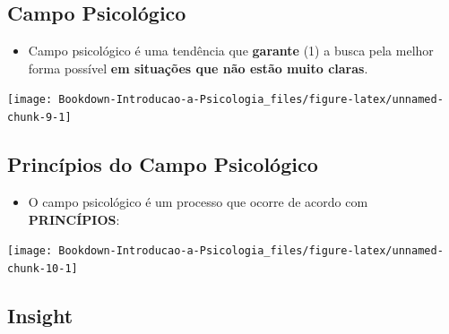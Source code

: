 \documentclass[
]{book}
\providecommand{\tightlist}{%
  \setlength{\itemsep}{0pt}\setlength{\parskip}{0pt}}
\begin{document}
\hypertarget{campo-psicoluxf3gico}{%
\subsection{Campo Psicológico}\label{campo-psicoluxf3gico}}

\begin{itemize}
\tightlist
\item
  Campo psicológico é uma tendência que \textbf{garante} (1) a busca pela
  melhor forma possível \textbf{em situações que não estão muito claras}.
\end{itemize}

\texttt{[image: Bookdown-Introducao-a-Psicologia\_files/figure-latex/unnamed-chunk-9-1]}

\hypertarget{princuxedpios-do-campo-psicoluxf3gico}{%
\subsection{Princípios do Campo Psicológico}\label{princuxedpios-do-campo-psicoluxf3gico}}

\begin{itemize}
\tightlist
\item
  O campo psicológico é um processo que ocorre de acordo com
  \textbf{PRINCÍPIOS}:
\end{itemize}

\texttt{[image: Bookdown-Introducao-a-Psicologia\_files/figure-latex/unnamed-chunk-10-1]}

\hypertarget{insight}{%
\subsection{Insight}\label{insight}}
\end{document}
